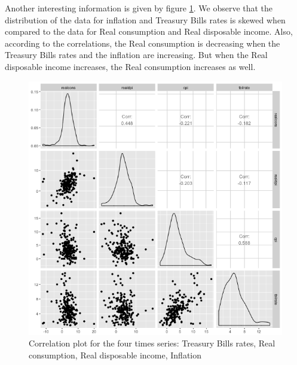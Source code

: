 \newpage

Another interesting information is given by figure \ref{corrplot}. We observe that the distribution of the data for inflation and Treasury Bills rates is skewed when compared to the data for Real consumption and Real disposable income. Also, according to the correlations, the Real consumption is decreasing when the Treasury Bills rates and the inflation are increasing. But when the Real disposable income increases, the Real consumption increases as well. 

\begin{figure}[!htb]
\centering
\includegraphics[width=12cm]{gfx/chapter-rvfl-ensembles/scatterplot.png}
\caption{Correlation plot for the four times series: Treasury Bills rates, Real consumption, Real disposable income, Inflation}
\label{corrplot}
\end{figure}
